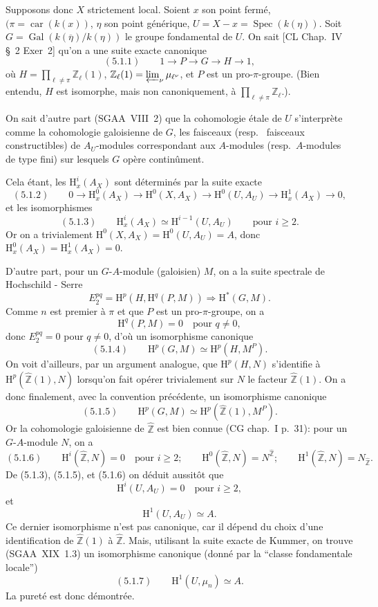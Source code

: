 \documentclass[11pt]{article}
\renewcommand{\H}{\mathrm{H}}
\DeclareMathOperator{\Spec}{Spec}
\newcommand{\Z}{\mathbb{Z}}
\newcommand{\car}{\operatorname{car}}
\newcommand{\ol}[1]{\overline{#1}}
\providecommand{\Gal}{\operatorname{Gal}}
\providecommand{\car}{\operatorname{car}}
\providecommand{\car}{\operatorname{car}}
\providecommand{\Z}{\mathbb Z}
\providecommand{\Spec}{\operatorname{Spec}}
\providecommand{\Spec}{\operatorname{Spec}}
\providecommand{\Spec}{\operatorname{Spec}}
\providecommand{\car}{\operatorname{car}}
\providecommand{\Spec}{\operatorname{Spec}}
\providecommand{\Gal}{\operatorname{Gal}}
\begin{document}
Supposons donc $X$ strictement local. Soient $x$ son point fermé, $(\pi=\car(k(x))$, $\eta$ son point générique, $U=X-x=\Spec(k(\eta))$. Soit $G=\Gal(k(\ol{\eta})/k(\eta))$ le groupe fondamental de $U$. On sait [CL Chap.~IV \S~2 Exer~2] qu'on a une suite exacte canonique
\[
(5.1.1)\qquad 1\longrightarrow P\longrightarrow G\longrightarrow H\longrightarrow1,
\]
où $H=\prod_{\ell\ne\pi}\Z_\ell(1)$, $\Z_\ell(1)=\varprojlim_{\nu} \mu_{\ell^\nu}$, et $P$ est un pro-$\pi$-groupe. (Bien entendu, $H$ est isomorphe, mais non canoniquement, à $\prod_{\ell\ne\pi}\Z_\ell$.).

On sait d'autre part (SGAA~VIII~2) que la cohomologie étale de $U$ s'interprète comme la cohomologie galoisienne de $G$, les faisceaux (resp.~
faisceaux constructibles) de $A_U$-modules correspondant aux $A$-modules (resp.~$A$-modules de type fini) sur lesquels $G$ opère continûment.

Cela étant, les $\H_x^i(A_X)$ sont déterminés par la suite exacte
\[
(5.1.2)\qquad 0\longrightarrow \H_x^0(A_X)\longrightarrow \H^0(X,A_X)\longrightarrow \H^0(U,A_U)\longrightarrow \H_x^1(A_X)\longrightarrow0,
\]
et les isomorphismes
\[
(5.1.3)\qquad \H_x^i(A_X)\simeq \H^{i-1}(U,A_U)\qquad\text{pour }i\geqslant2.
\]
Or on a trivialement $\H^0(X,A_X)=\H^0(U,A_U)=A$, donc $\H_x^0(A_X)=\H_x^1(A_X)=0$.

D'autre part, pour un $G$-$A$-module (galoisien) $M$, on a la suite spectrale de Hochschild - Serre
\[
E_2^{pq}=\H^p(H,\H^q(P,M))\Longrightarrow \H^{*}(G,M).
\]
Comme $n$ est premier à $\pi$ et que $P$ est un pro-$\pi$-groupe, on a
\[
\H^q(P,M)=0\quad\text{pour }q\ne0,
\]
donc $E_2^{pq}=0$ pour $q\ne0$, d'où un isomorphisme canonique
\[
(5.1.4)\qquad \H^p(G,M)\simeq \H^p(H,M^P).
\]
On voit d'ailleurs, par un argument analogue, que $\H^p(H,N)$ s'identifie à $\H^p(\widehat{\Z}(1),N)$ lorsqu'on fait opérer trivialement sur $N$ le facteur $\widehat{\Z}(1)$. On a donc finalement, avec la convention précédente, un isomorphisme canonique
\[
(5.1.5)\qquad \H^p(G,M)\simeq \H^p(\widehat{\Z}(1),M^P).
\]
Or la cohomologie galoisienne de $\widehat{\Z}$ est bien connue (CG chap.~I p.~31): pour un $G$-$A$-module $N$, on a
\[
(5.1.6)\qquad
\H^i(\widehat{\Z},N)=0\quad\text{pour }i\geqslant2;
\qquad
\H^0(\widehat{\Z},N)=N^{\widehat{\Z}};
\qquad
\H^1(\widehat{\Z},N)=N_{\widehat{\Z}}.
\]
De (5.1.3), (5.1.5), et (5.1.6) on déduit aussitôt que
\[
\H^i(U,A_U)=0\quad\text{pour }i\geqslant2,
\]
et
\[
\H^1(U,A_U)\simeq A.
\]
Ce dernier
isomorphisme n'est pas canonique, car il dépend du choix d'une identification de $\widehat{\Z}(1)$ à $\widehat{\Z}$. Mais, utilisant la suite exacte de Kummer, on trouve (SGAA~XIX~1.3) un isomorphisme canonique (donné par la ``classe fondamentale locale'')
\[
(5.1.7)\qquad \H^1(U,\mu_n)\simeq A.
\]
La pureté est donc démontrée.
\end{document}
